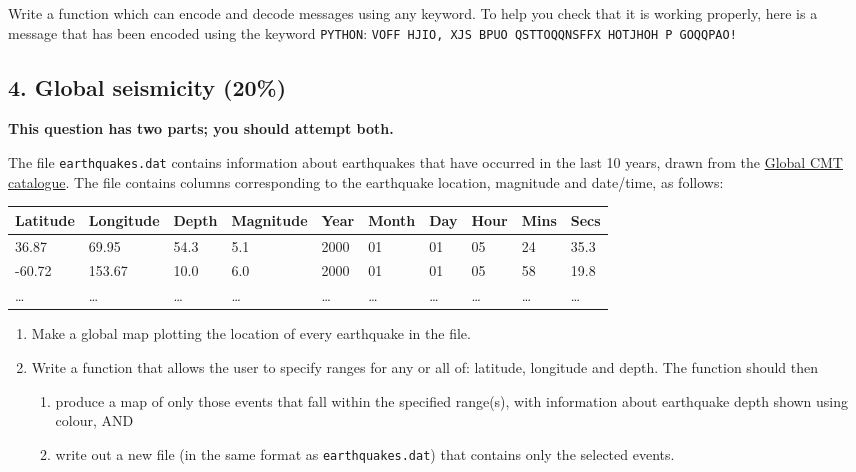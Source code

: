 \documentclass[11pt]{article}
\providecommand{\tightlist}{%
      \setlength{\itemsep}{0pt}\setlength{\parskip}{0pt}}
\begin{document}
Write a function which can encode and decode messages using any keyword.
To help you check that it is working properly, here is a message that
has been encoded using the keyword \texttt{PYTHON}:
\texttt{VOFF\ HJIO,\ XJS\ BPUO\ QSTTOQQNSFFX\ HOTJHOH\ P\ GOQQPAO!}

    \hypertarget{global-seismicity-20}{%
\subsection*{4. Global seismicity (20\%)}\label{global-seismicity-20}}

\textbf{This question has two parts; you should attempt both.}

The file \texttt{earthquakes.dat} contains information about earthquakes
that have occurred in the last 10 years, drawn from the
\href{http://www.globalcmt.org}{Global CMT catalogue}. The file contains
columns corresponding to the earthquake location, magnitude and
date/time, as follows:

\begin{longtable}[]{@{}llllllllll@{}}
\toprule
Latitude & Longitude & Depth & Magnitude & Year & Month & Day & Hour &
Mins & Secs\tabularnewline
\midrule
\endhead
36.87 & 69.95 & 54.3 & 5.1 & 2000 & 01 & 01 & 05 & 24 &
35.3\tabularnewline
-60.72 & 153.67 & 10.0 & 6.0 & 2000 & 01 & 01 & 05 & 58 &
19.8\tabularnewline
\ldots{} & \ldots{} & \ldots{} & \ldots{} & \ldots{} & \ldots{} &
\ldots{} & \ldots{} & \ldots{} & \ldots{}\tabularnewline
\bottomrule
\end{longtable}

\begin{enumerate}
\def\labelenumi{\arabic{enumi}.}
\item
  Make a global map plotting the location of every earthquake in the
  file.
\item
  Write a function that allows the user to specify ranges for any or all
  of: latitude, longitude and depth. The function should then

  \begin{enumerate}
  \def\labelenumii{\arabic{enumii}.}
  \tightlist
  \item
    produce a map of only those events that fall within the specified
    range(s), with information about earthquake depth shown using
    colour, AND
  \item
    write out a new file (in the same format as
    \texttt{earthquakes.dat}) that contains only the selected events.
  \end{enumerate}
\end{enumerate}
\end{document}
